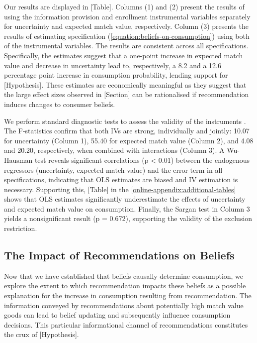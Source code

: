 \documentclass[12pt]{article}
\theoremstyle{newtheorem}
\begin{document}
Our results are displayed in [Table]. 
Columns (1) and (2) present the results of using the information provision and enrollment instrumental variables separately for uncertainty and expected match value, respectively. 
Column (3) presents the results of estimating specification (\ref{equation:beliefs-on-consumption}) using both of the instrumental variables. 
The results are consistent across all specifications.
Specifically, the estimates suggest that a one-point increase in expected match value and decrease in uncertainty lead to, respectively, a 8.2 and a 12.6 percentage point increase in consumption probability, lending support for [Hypothesis]. 
These estimates are economically meaningful as they suggest that the large effect sizes observed in [Section] can be rationalised if recommendation induces changes to consumer beliefs.


We perform standard diagnostic tests to assess the validity of the instruments \citep{Wooldridge2010Econometric}. 
The F-statistics confirm that both IVs are strong, individually and jointly: 10.07 for uncertainty (Column 1), 55.40 for expected match value (Column 2), and 4.08 and 20.20, respectively, when combined with interactions (Column 3).
A Wu-Hausman test reveals significant correlations (p < 0.01) between the endogenous regressors (uncertainty, expected match value) and the error term in all specifications, indicating that OLS estimates are biased and IV estimation is necessary. 
Supporting this, [Table] in the \ref{online-appendix:additional-tables} shows that OLS estimates significantly underestimate the effects of uncertainty and expected match value on consumption.
Finally, the Sargan test in Column 3 yields a nonsignificant result (p = 0.672), supporting the validity of the exclusion restriction.



\subsection{The Impact of Recommendations on Beliefs}
\label{section:mechanisms:beliefs-on-rec}


Now that we have established that beliefs causally determine consumption, 
we explore the extent to which recommendation impacts these beliefs as a possible explanation for the increase in consumption resulting from recommendation. 
The information conveyed by recommendations about potentially high match value goods can lead to belief updating and subsequently influence consumption decisions. 
This particular informational channel of recommendations constitutes the crux of [Hypothesis]. 
\end{document}
